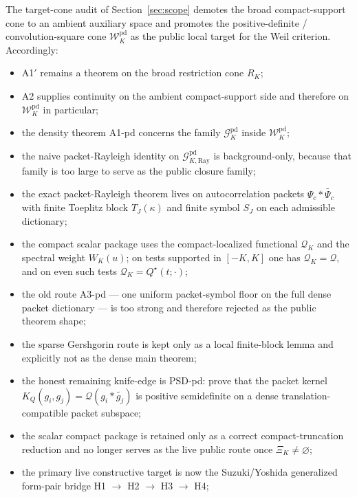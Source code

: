 \noindent The target-cone audit of Section~\ref{sec:scope} demotes the broad compact-support cone
to an ambient auxiliary space and promotes the positive-definite /
convolution-square cone $\mathcal W_K^{\mathrm{pd}}$ as the public local target for the
Weil criterion. Accordingly:
\begin{itemize}
  \item A1$'$ remains a theorem on the broad restriction cone $R_K$;
  \item A2 supplies continuity on the ambient compact-support side and therefore on
  $\mathcal W_K^{\mathrm{pd}}$ in particular;
  \item the density theorem A1-pd concerns the family
  $\mathcal G_K^{\mathrm{pd}}$ inside $\mathcal W_K^{\mathrm{pd}}$;
  \item the naive packet-Rayleigh identity on
  $\mathcal G_{K,\mathrm{Ray}}^{\mathrm{pd}}$ is background-only, because that family
  is too large to serve as the public closure family;
  \item the exact packet-Rayleigh theorem lives on autocorrelation packets
  $\Psi_c * \widetilde{\Psi_c}$ with finite Toeplitz block $T_J(\kappa)$ and
  finite symbol $S_J$ on each admissible dictionary;
  \item the compact scalar package uses the compact-localized functional
  $\mathcal Q_K$ and the spectral weight $W_K(u)$; on tests supported in
  $[-K,K]$ one has $\mathcal Q_K=\mathcal Q$, and on even such tests
  $\mathcal Q_K=Q^\star(t;\cdot)$;
  \item the old route \textup{A3-pd} --- one uniform packet-symbol floor on the full dense
  packet dictionary --- is too strong and therefore rejected as the public theorem shape;
  \item the sparse Gershgorin route is kept only as a local finite-block lemma
  and explicitly not as the dense main theorem;
  \item the honest remaining knife-edge is \textup{PSD-pd}: prove that the packet kernel
  $K_Q(g_i,g_j)=\mathcal Q(g_i * \widetilde{g_j})$ is positive semidefinite on a
  dense translation-compatible packet subspace;
  \item the scalar compact package is retained only as a correct
  compact-truncation reduction and no longer serves as the live public route
  once $\Xi_K\neq\varnothing$;
  \item the primary live constructive target is now the Suzuki/Yoshida
  generalized form-pair bridge \textup{H1} $\to$ \textup{H2} $\to$ \textup{H3} $\to$ \textup{H4};

\end{itemize}
